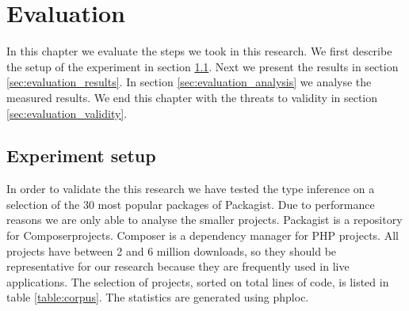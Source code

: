 \documentclass[../main.tex]{subfiles}
\begin{document}
    \chapter{Evaluation}\label{ch:evaluation}
    
	In this chapter we evaluate the steps we took in this research.
	We first describe the setup of the experiment in section \ref{sec:evaluation_experiment_setup}.
	Next we present the results in section \ref{sec:evaluation_results}.
	In section \ref{sec:evaluation_analysis} we analyse the measured results.
	We end this chapter with the threats to validity in section \ref{sec:evaluation_validity}.
	
	\section{Experiment setup}\label{sec:evaluation_experiment_setup}
	
	In order to validate the this research we have tested the type inference on a selection of the 30 most popular packages of Packagist\footnotemark.
	Due to performance reasons we are only able to analyse the smaller projects.
	Packagist is a repository for Composer\footnotemark projects.
	Composer is a dependency manager for PHP projects.
	All projects have between 2 and 6 million downloads, so they should be representative for our research because they are frequently used in live applications.
	The selection of projects, sorted on total lines of code, is listed in table \ref{table:corpus}.
	The statistics are generated using phploc\footnotemark.
\end{document}
